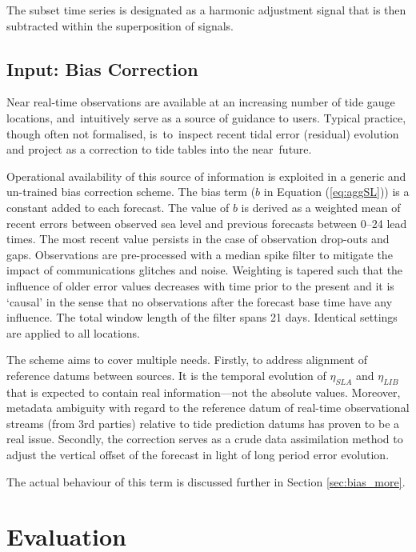 The subset time series is designated as a harmonic adjustment signal that is then subtracted within the superposition of signals. 


\subsection{Input: Bias Correction}
\label{sec:bias}
Near real-time observations are available at an increasing number of tide gauge locations, and~intuitively serve as a source of guidance to users.
Typical practice, though often not formalised, is~to~inspect recent tidal error (residual) evolution and project as a correction to tide tables into the near~future.

Operational availability of this source of information is exploited in a generic and un-trained bias correction scheme. 
The bias term ($b$ in Equation (\ref{eq:aggSL})) is a constant added to each forecast.
The value of $b$ is derived as a weighted mean of recent errors between observed sea level and previous forecasts between 0--24 lead times.
The most recent value persists in the case of observation drop-outs and gaps.
Observations are pre-processed with a median spike filter to mitigate the impact of communications glitches and noise.
Weighting is tapered such that the influence of older error values decreases with time prior to the present and it is `causal' in the sense that no observations after the forecast base time have any influence.
The total window length of the filter spans 21 days.
Identical settings are applied to all locations.


The scheme aims to cover multiple needs.
Firstly, to address alignment of reference datums between sources. 
It is the temporal evolution of $\eta_{SLA}$ and $\eta_{LIB}$ that is expected to contain real information---not the absolute values.
Moreover, metadata ambiguity with regard to the reference datum of real-time observational streams (from 3rd parties) relative to tide prediction datums has proven to be a real issue.
Secondly, the correction serves as a crude data assimilation method to adjust the vertical offset of the forecast in light of long period error evolution. 

The actual behaviour of this term is discussed further in Section \ref{sec:bias_more}.

\section{Evaluation}

